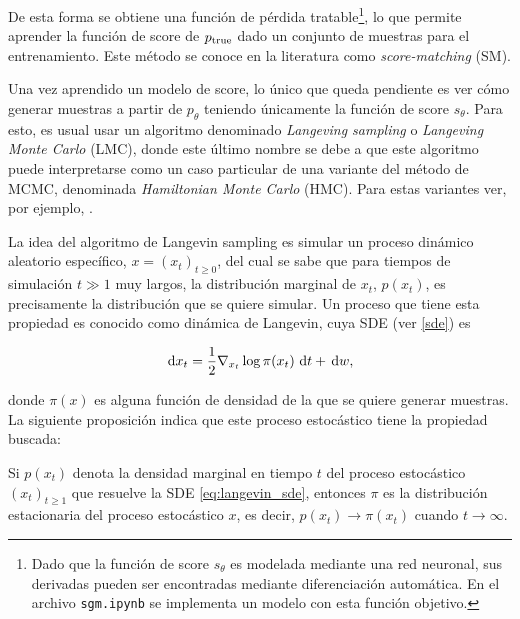 De esta forma se obtiene una función de pérdida tratable\footnote{Dado que la función de score $s_\theta$ es modelada mediante una red neuronal, sus derivadas pueden ser encontradas mediante diferenciación automática. En el archivo \texttt{sgm.ipynb} se implementa un modelo con esta función objetivo.}, lo que permite aprender la función de score de $p_{\operatorname{true}}$ dado un conjunto de muestras para el entrenamiento. Este método se conoce en la literatura como \textit{score-matching} (SM).

Una vez aprendido un modelo de score, lo único que queda pendiente es ver cómo generar muestras a partir de $p_\theta$ teniendo únicamente la función de score $s_\theta$. Para esto, es usual usar un algoritmo denominado \textit{Langeving sampling} o \textit{Langeving Monte Carlo} (LMC), donde este último nombre se debe a que este algoritmo puede interpretarse como un caso particular de una variante del método de MCMC, denominada \textit{Hamiltonian Monte Carlo} (HMC). Para estas variantes ver, por ejemplo, \cite{pml2Book}.

La idea del algoritmo de Langevin sampling es simular un proceso dinámico aleatorio específico, $x=(x_t)_{t\geq 0}$,  del cual se sabe que para tiempos de simulación $t\gg 1$ muy largos, la distribución marginal de $x_t$, $p(x_t)$, es precisamente la distribución que se quiere simular. Un proceso que tiene esta propiedad es conocido como dinámica de Langevin, cuya SDE (ver \autoref{sde}) es

\begin{equation}
    \label{eq:langevin_sde}
    \,\operatorname{d}\! x_t = \frac{1}{2}\nabla_{x_t} \log \pi(x_t) \,\operatorname{d}\! t + \,\operatorname{d}\! w ,
\end{equation}

donde $\pi(x)$ es alguna función de densidad de la que se quiere generar muestras. La siguiente proposición indica que este proceso estocástico tiene la propiedad buscada:

\begin{prop}
    Si $p(x_t)$ denota la densidad marginal en tiempo $t$ del proceso estocástico $(x_t)_{t\geq 1}$ que resuelve la SDE \eqref{eq:langevin_sde}, entonces $\pi$ es la distribución estacionaria del proceso estocástico $x$, es decir, $p(x_t)\to \pi(x_t)$ cuando $t\to\infty$.
\end{prop}

